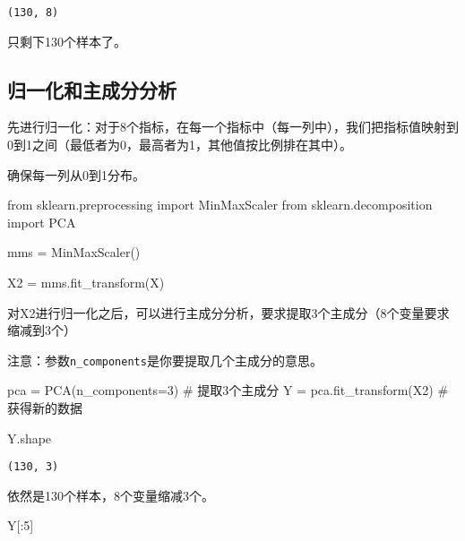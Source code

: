 \documentclass[
  letterpaper,
  DIV=11,
  numbers=noendperiod]{scrreprt}
\newenvironment{Shaded}{\begin{snugshade}}{\end{snugshade}}
\newcommand{\CommentTok}[1]{\textcolor[rgb]{0.37,0.37,0.37}{#1}}
\newcommand{\DecValTok}[1]{\textcolor[rgb]{0.68,0.00,0.00}{#1}}
\newcommand{\ImportTok}[1]{\textcolor[rgb]{0.00,0.46,0.62}{#1}}
\newcommand{\NormalTok}[1]{\textcolor[rgb]{0.00,0.23,0.31}{#1}}
\newcommand{\OperatorTok}[1]{\textcolor[rgb]{0.37,0.37,0.37}{#1}}
\begin{document}
\begin{verbatim}
(130, 8)
\end{verbatim}

只剩下130个样本了。

\hypertarget{ux5f52ux4e00ux5316ux548cux4e3bux6210ux5206ux5206ux6790}{%
\subsection{归一化和主成分分析}\label{ux5f52ux4e00ux5316ux548cux4e3bux6210ux5206ux5206ux6790}}

先进行归一化：对于8个指标，在每一个指标中（每一列中），我们把指标值映射到0到1之间（最低者为0，最高者为1，其他值按比例排在其中）。

确保每一列从0到1分布。

\begin{Shaded}
\begin{Highlighting}[]
\ImportTok{from}\NormalTok{ sklearn.preprocessing }\ImportTok{import}\NormalTok{ MinMaxScaler}
\ImportTok{from}\NormalTok{ sklearn.decomposition }\ImportTok{import}\NormalTok{ PCA}

\NormalTok{mms }\OperatorTok{=}\NormalTok{ MinMaxScaler()}

\NormalTok{X2 }\OperatorTok{=}\NormalTok{ mms.fit\_transform(X)}
\end{Highlighting}
\end{Shaded}

对X2进行归一化之后，可以进行主成分分析，要求提取3个主成分（8个变量要求缩减到3个）

注意：参数\texttt{n\_components}是你要提取几个主成分的意思。

\begin{Shaded}
\begin{Highlighting}[]
\NormalTok{pca }\OperatorTok{=}\NormalTok{ PCA(n\_components}\OperatorTok{=}\DecValTok{3}\NormalTok{) }\CommentTok{\# 提取3个主成分}
\NormalTok{Y }\OperatorTok{=}\NormalTok{ pca.fit\_transform(X2) }\CommentTok{\# 获得新的数据}

\NormalTok{Y.shape}
\end{Highlighting}
\end{Shaded}

\begin{verbatim}
(130, 3)
\end{verbatim}

依然是130个样本，8个变量缩减3个。

\begin{Shaded}
\begin{Highlighting}[]
\NormalTok{Y[:}\DecValTok{5}\NormalTok{]}
\end{Highlighting}
\end{Shaded}
\end{document}
